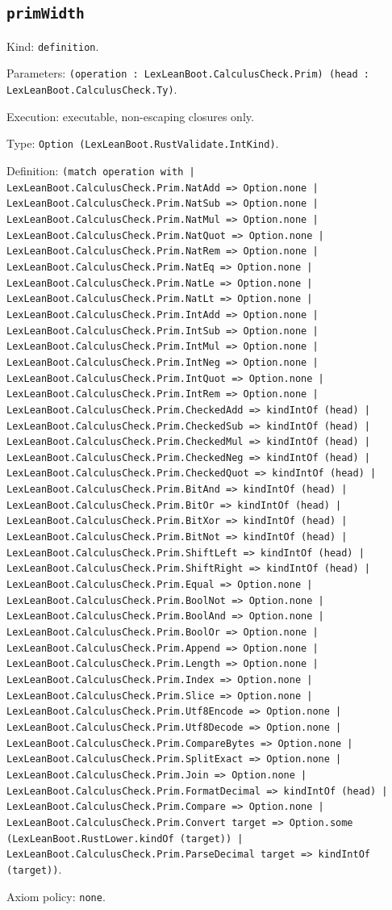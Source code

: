 \documentclass[11pt]{article}
\begin{document}
\subsection*{\texttt{primWidth}}
\noindent Kind: \texttt{definition}.\par
\noindent Parameters: \texttt{(operation : LexLeanBoot.CalculusCheck.Prim) (head : LexLeanBoot.CalculusCheck.Ty)}.\par
\noindent Execution: executable, non-escaping closures only.\par
\noindent Type: \texttt{Option (LexLeanBoot.RustValidate.IntKind)}.\par
\noindent Definition: \texttt{(match operation with | LexLeanBoot.CalculusCheck.Prim.NatAdd => Option.none | LexLeanBoot.CalculusCheck.Prim.NatSub => Option.none | LexLeanBoot.CalculusCheck.Prim.NatMul => Option.none | LexLeanBoot.CalculusCheck.Prim.NatQuot => Option.none | LexLeanBoot.CalculusCheck.Prim.NatRem => Option.none | LexLeanBoot.CalculusCheck.Prim.NatEq => Option.none | LexLeanBoot.CalculusCheck.Prim.NatLe => Option.none | LexLeanBoot.CalculusCheck.Prim.NatLt => Option.none | LexLeanBoot.CalculusCheck.Prim.IntAdd => Option.none | LexLeanBoot.CalculusCheck.Prim.IntSub => Option.none | LexLeanBoot.CalculusCheck.Prim.IntMul => Option.none | LexLeanBoot.CalculusCheck.Prim.IntNeg => Option.none | LexLeanBoot.CalculusCheck.Prim.IntQuot => Option.none | LexLeanBoot.CalculusCheck.Prim.IntRem => Option.none | LexLeanBoot.CalculusCheck.Prim.CheckedAdd => kindIntOf (head) | LexLeanBoot.CalculusCheck.Prim.CheckedSub => kindIntOf (head) | LexLeanBoot.CalculusCheck.Prim.CheckedMul => kindIntOf (head) | LexLeanBoot.CalculusCheck.Prim.CheckedNeg => kindIntOf (head) | LexLeanBoot.CalculusCheck.Prim.CheckedQuot => kindIntOf (head) | LexLeanBoot.CalculusCheck.Prim.BitAnd => kindIntOf (head) | LexLeanBoot.CalculusCheck.Prim.BitOr => kindIntOf (head) | LexLeanBoot.CalculusCheck.Prim.BitXor => kindIntOf (head) | LexLeanBoot.CalculusCheck.Prim.BitNot => kindIntOf (head) | LexLeanBoot.CalculusCheck.Prim.ShiftLeft => kindIntOf (head) | LexLeanBoot.CalculusCheck.Prim.ShiftRight => kindIntOf (head) | LexLeanBoot.CalculusCheck.Prim.Equal => Option.none | LexLeanBoot.CalculusCheck.Prim.BoolNot => Option.none | LexLeanBoot.CalculusCheck.Prim.BoolAnd => Option.none | LexLeanBoot.CalculusCheck.Prim.BoolOr => Option.none | LexLeanBoot.CalculusCheck.Prim.Append => Option.none | LexLeanBoot.CalculusCheck.Prim.Length => Option.none | LexLeanBoot.CalculusCheck.Prim.Index => Option.none | LexLeanBoot.CalculusCheck.Prim.Slice => Option.none | LexLeanBoot.CalculusCheck.Prim.Utf8Encode => Option.none | LexLeanBoot.CalculusCheck.Prim.Utf8Decode => Option.none | LexLeanBoot.CalculusCheck.Prim.CompareBytes => Option.none | LexLeanBoot.CalculusCheck.Prim.SplitExact => Option.none | LexLeanBoot.CalculusCheck.Prim.Join => Option.none | LexLeanBoot.CalculusCheck.Prim.FormatDecimal => kindIntOf (head) | LexLeanBoot.CalculusCheck.Prim.Compare => Option.none | LexLeanBoot.CalculusCheck.Prim.Convert target => Option.some (LexLeanBoot.RustLower.kindOf (target)) | LexLeanBoot.CalculusCheck.Prim.ParseDecimal target => kindIntOf (target))}.\par
\noindent Axiom policy: \texttt{none}.\par
\end{document}
